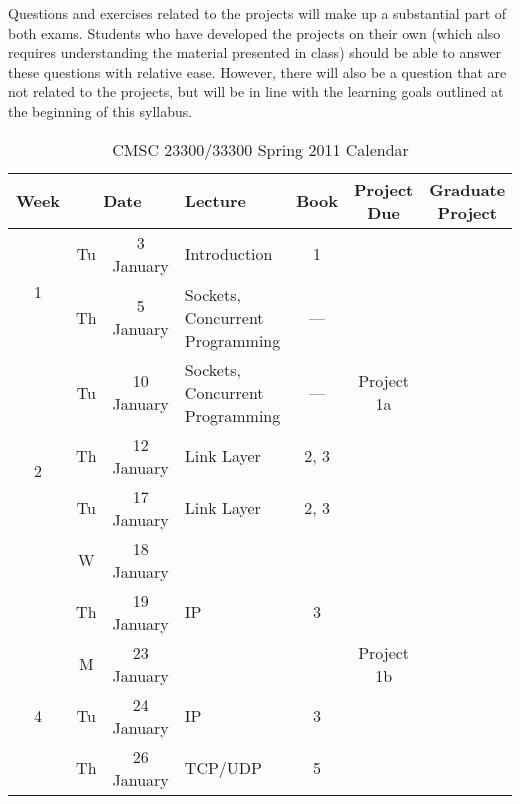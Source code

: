 \documentclass[11pt]{article}
\begin{document}
Questions and exercises related to the projects will make up a substantial part of both exams. Students who have developed the projects on their own (which also requires understanding the material presented in class) should be able to answer these questions with relative ease. However, there will also be a question that are not related to the projects, but will be in line with the learning goals outlined at the beginning of this syllabus.


\begin{sidewaystable}
\sffamily
\setlength{\extrarowheight}{4pt}
\caption{CMSC 23300/33300 Spring 2011 Calendar}
\begin{tabular}{|c|cc||p{8cm}|c|c|c|}
\hline
\textbf{Week} &  \multicolumn{2}{|c||}{\textbf{Date}} & \textbf{Lecture} & \textbf{Book} & \textbf{Project Due} & \textbf{Graduate Project} \\\hline

\multirow{2}{*}{1}  & Tu & 3 January & Introduction                                    & 1 & \cellcolor[gray]{0.9}  & \cellcolor[gray]{0.9} \\\cline{2-6}
                    & Th & 5 January & Sockets, Concurrent Programming                 & --- & \cellcolor[gray]{0.9}  & \cellcolor[gray]{0.9} \\\hline\hline

\multirow{4}{*}{2}  & Tu & 10 January & Sockets, Concurrent Programming                & --- & Project 1a  & \cellcolor[gray]{0.9} \\\cline{2-6}
                    & Th & 12 January & Link Layer                                     & 2, 3 & \cellcolor[gray]{0.9} & \cellcolor[gray]{0.9} \\\hline\hline

\multirow{3}{*}{3}  & Tu & 17 January & Link Layer          & 2, 3 & \cellcolor[gray]{0.9}  & \cellcolor[gray]{0.9} \\\cline{2-6}
                    & W & 18 January & \cellcolor[gray]{0.9} & \cellcolor[gray]{0.9} & \cellcolor[gray]{0.9} & \cellcolor[gray]{0.9} \\\cline{2-6}
                    & Th & 19 January & IP          & 3 & \cellcolor[gray]{0.9}  & \cellcolor[gray]{0.9} \\\hline\hline

\multirow{3}{*}{4}  & M & 23 January & \cellcolor[gray]{0.9} & \cellcolor[gray]{0.9} &  Project 1b & \cellcolor[gray]{0.9} \\\cline{2-6}
                    & Tu & 24 January & IP             & 3 & \cellcolor[gray]{0.9}  & \cellcolor[gray]{0.9} \\\cline{2-6}
                    & Th & 26 January & TCP/UDP                 & 5 & \cellcolor[gray]{0.9}  & \cellcolor[gray]{0.9} \\\hline\hline


\end{tabular}
\end{sidewaystable}
\end{document}
